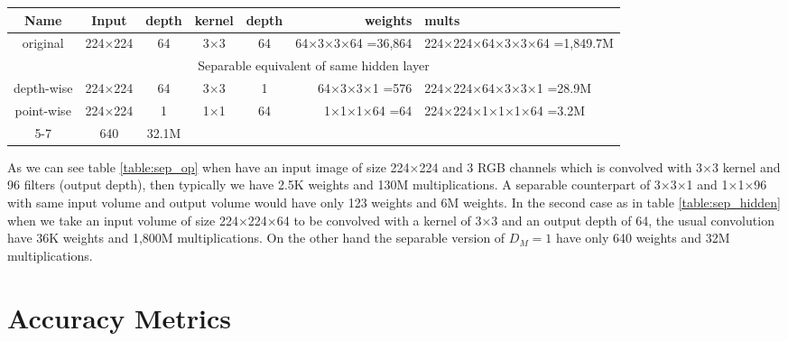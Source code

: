 \begin{table*}\caption{Separable operators reduction applied to hidden layer}\label{table:sep_hidden}
\centering
\begin{small}
\begin{tabularx}{\textwidth}{cccccrX}
\toprule
Name & Input & depth & kernel & depth & weights & mults \\
\midrule
original & 224×224 & 64 & 3×3 & 64 & 64×3×3×64 =36,864 & 224×224×64×3×3×64 =1,849.7M \\
\bottomrule
\multicolumn{7}{c}{Separable equivalent of same hidden layer} \\
\midrule
depth-wise & 224×224 & 64 & 3×3 & 1 & 64×3×3×1 =576 & 224×224×64×3×3×1 =28.9M \\
\midrule
point-wise & 224×224 & 1 & 1×1 & 64 & 1×1×1×64 =64 & 224×224×1×1×1×64 =3.2M \\
\cmidrule{5-7}
\multicolumn{5}{r}{Total} & 640 & 32.1M \\
\bottomrule
\end{tabularx}
\end{small}
\end{table*}

As we can see table \ref{table:sep_op} when have an input image of size 224×224 and 3 RGB channels
which is convolved with 3×3 kernel and 96 filters (output depth),
then typically we have 2.5K weights and 130M multiplications.
A separable counterpart of 3×3×1 and 1×1×96 with same input volume
and output volume would have only 123 weights and 6M weights.
In the second case as in table \ref{table:sep_hidden} when we take an input volume of size 224×224×64 to be convolved with a kernel of 3×3
and an output depth of 64, the usual convolution have 36K weights and 1,800M multiplications.
On the other hand the separable version of \(D_M=1\) have only 640 weights and 32M multiplications.

\section{Accuracy Metrics}

